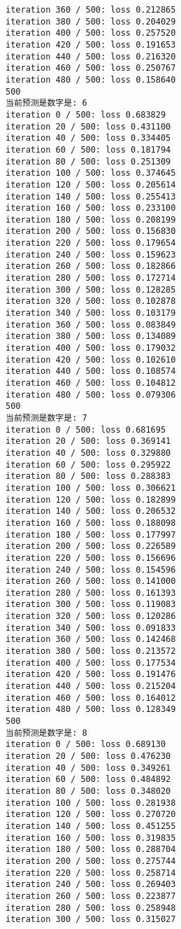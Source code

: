 \documentclass[11pt]{article}
\begin{document}
\begin{Verbatim}[commandchars=\\\{\}]
iteration 360 / 500: loss 0.212865
iteration 380 / 500: loss 0.204029
iteration 400 / 500: loss 0.257520
iteration 420 / 500: loss 0.191653
iteration 440 / 500: loss 0.216320
iteration 460 / 500: loss 0.250767
iteration 480 / 500: loss 0.158640
500
当前预测是数字是: 6
iteration 0 / 500: loss 0.683829
iteration 20 / 500: loss 0.431100
iteration 40 / 500: loss 0.334405
iteration 60 / 500: loss 0.181794
iteration 80 / 500: loss 0.251309
iteration 100 / 500: loss 0.374645
iteration 120 / 500: loss 0.205614
iteration 140 / 500: loss 0.255413
iteration 160 / 500: loss 0.233100
iteration 180 / 500: loss 0.208199
iteration 200 / 500: loss 0.156830
iteration 220 / 500: loss 0.179654
iteration 240 / 500: loss 0.159623
iteration 260 / 500: loss 0.182866
iteration 280 / 500: loss 0.172714
iteration 300 / 500: loss 0.128285
iteration 320 / 500: loss 0.102878
iteration 340 / 500: loss 0.103179
iteration 360 / 500: loss 0.083849
iteration 380 / 500: loss 0.134089
iteration 400 / 500: loss 0.179032
iteration 420 / 500: loss 0.102610
iteration 440 / 500: loss 0.108574
iteration 460 / 500: loss 0.104812
iteration 480 / 500: loss 0.079306
500
当前预测是数字是: 7
iteration 0 / 500: loss 0.681695
iteration 20 / 500: loss 0.369141
iteration 40 / 500: loss 0.329880
iteration 60 / 500: loss 0.295922
iteration 80 / 500: loss 0.288383
iteration 100 / 500: loss 0.306621
iteration 120 / 500: loss 0.182899
iteration 140 / 500: loss 0.206532
iteration 160 / 500: loss 0.188098
iteration 180 / 500: loss 0.177997
iteration 200 / 500: loss 0.226589
iteration 220 / 500: loss 0.156696
iteration 240 / 500: loss 0.154596
iteration 260 / 500: loss 0.141000
iteration 280 / 500: loss 0.161393
iteration 300 / 500: loss 0.119083
iteration 320 / 500: loss 0.120286
iteration 340 / 500: loss 0.091833
iteration 360 / 500: loss 0.142468
iteration 380 / 500: loss 0.213572
iteration 400 / 500: loss 0.177534
iteration 420 / 500: loss 0.191476
iteration 440 / 500: loss 0.215204
iteration 460 / 500: loss 0.164012
iteration 480 / 500: loss 0.128349
500
当前预测是数字是: 8
iteration 0 / 500: loss 0.689130
iteration 20 / 500: loss 0.476230
iteration 40 / 500: loss 0.349261
iteration 60 / 500: loss 0.484892
iteration 80 / 500: loss 0.348020
iteration 100 / 500: loss 0.281938
iteration 120 / 500: loss 0.270720
iteration 140 / 500: loss 0.451255
iteration 160 / 500: loss 0.319835
iteration 180 / 500: loss 0.288704
iteration 200 / 500: loss 0.275744
iteration 220 / 500: loss 0.258714
iteration 240 / 500: loss 0.269403
iteration 260 / 500: loss 0.223877
iteration 280 / 500: loss 0.258948
iteration 300 / 500: loss 0.315027

\end{Verbatim}
\end{document}
